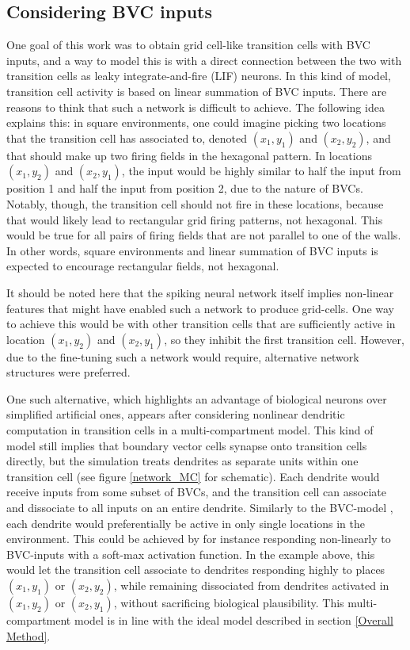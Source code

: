 \documentclass{article}
\begin{document}
    \subsection{Considering BVC inputs} \label{Considering BVC inputs}

    One goal of this work was to obtain grid cell-like transition cells with BVC inputs, and a way to model this is with a direct connection between the two with transition cells as leaky integrate-and-fire (LIF) neurons. In this kind of model, transition cell activity is based on linear summation of BVC inputs. There are reasons to think that such a network is difficult to achieve. The following idea explains this: in square environments, one could imagine picking two locations that the transition cell has associated to, denoted \((x_1, y_1)\) and \((x_2, y_2)\), and that should make up two firing fields in the hexagonal pattern. In locations \((x_1, y_2)\) and \((x_2, y_1)\), the input would be highly similar to half the input from position 1 and half the input from position 2, due to the nature of BVCs. Notably, though, the transition cell should not fire in these locations, because that would likely lead to rectangular grid firing patterns, not hexagonal. This would be true for all pairs of firing fields that are not parallel to one of the walls. In other words, square environments and linear summation of BVC inputs is expected to encourage rectangular fields, not hexagonal.
    
    It should be noted here that the spiking neural network itself implies non-linear features that might have enabled such a network to produce grid-cells. One way to achieve this would be with other transition cells that are sufficiently active in location \((x_1, y_2)\) and \((x_2, y_1)\), so they inhibit the first transition cell. However, due to the fine-tuning such a network would require, alternative network structures were preferred.

    One such alternative, which highlights an advantage of biological neurons over simplified artificial ones, appears after considering nonlinear dendritic computation in transition cells in a multi-compartment model. This kind of model still implies that boundary vector cells synapse onto transition cells directly, but the simulation treats dendrites as separate units within one transition cell (see figure \ref{network_MC} for schematic). Each dendrite would receive inputs from some subset of BVCs, and the transition cell can associate and dissociate to all inputs on an entire dendrite. Similarly to the BVC-model \parencite{Barry2006}, each dendrite would preferentially be active in only single locations in the environment. This could be achieved by for instance responding non-linearly to BVC-inputs with a soft-max activation function. In the example above, this would let the transition cell associate to dendrites responding highly to places \((x_1, y_1)\) or \((x_2, y_2)\), while remaining dissociated from dendrites activated in \((x_1, y_2)\) or \((x_2, y_1)\), without sacrificing biological plausibility. This multi-compartment model is in line with the ideal model described in section \ref{Overall Method}.
\end{document}

